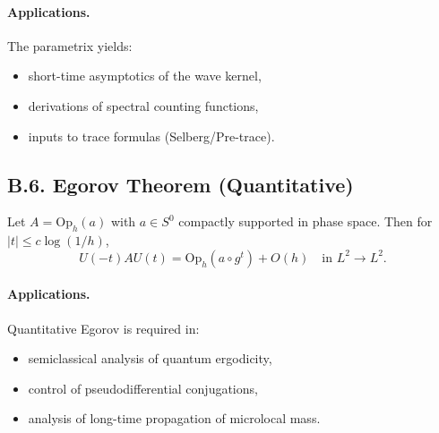 \paragraph{Applications.}
The parametrix yields:
\begin{itemize}
  \item short-time asymptotics of the wave kernel,
  \item derivations of spectral counting functions,
  \item inputs to trace formulas (Selberg/Pre-trace).
\end{itemize}

%

%
\subsection*{B.6. Egorov Theorem (Quantitative)}

\begin{theorem}\label{thm:B6}
Let $A = \mathrm{Op}_h(a)$ with $a \in S^0$ compactly supported in phase space.
Then for $|t| \leq c \log(1/h)$,
\begin{equation}
  U(-t) A U(t) = \mathrm{Op}_h(a \circ g^t) + O(h)
  \quad \text{in } L^2 \to L^2.
\end{equation}
\end{theorem}

\paragraph{Applications.}
Quantitative Egorov is required in:
\begin{itemize}
  \item semiclassical analysis of quantum ergodicity,
  \item control of pseudodifferential conjugations,
  \item analysis of long-time propagation of microlocal mass.
\end{itemize}

%

%

